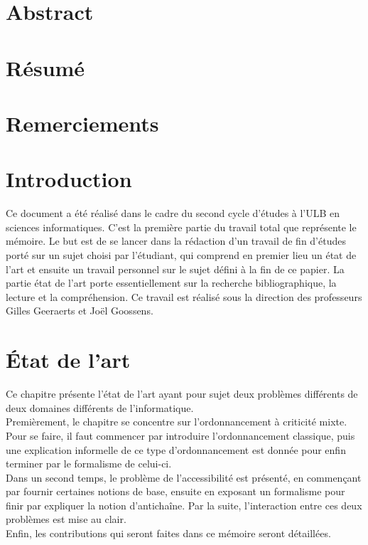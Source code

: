 \documentclass[12pt,a4paper,oneside]{book}
\theoremstyle{break}
\theoremstyle{breakplain}
\begin{document}
\newpage
\thispagestyle{empty} 
\null



\frontmatter



\chapter*{Abstract}

\chapter*{Résumé}

\chapter*{Remerciements}

\tableofcontents


\mainmatter


\chapter{Introduction}
Ce document a été réalisé dans le cadre du second cycle d'études à l'ULB en sciences informatiques. C'est la première partie du travail total que représente le mémoire. Le but est de se lancer dans la rédaction d'un travail de fin d'études porté sur un sujet choisi par l'étudiant, qui comprend en premier lieu un état de l'art et ensuite un travail personnel sur le sujet défini à la fin de ce papier. La partie état de l'art porte essentiellement sur la recherche bibliographique, la lecture et la compréhension. Ce travail est réalisé sous la direction des professeurs Gilles Geeraerts et Joël Goossens.


\chapter{État de l'art}

Ce chapitre présente l'état de l'art ayant pour sujet deux problèmes différents de deux domaines différents de l'informatique.\\
Premièrement, le chapitre se concentre sur l'ordonnancement à criticité mixte. Pour se faire, il faut commencer par introduire l'ordonnancement classique, puis une explication informelle de ce type d'ordonnancement est donnée pour enfin terminer par le formalisme de celui-ci.\\
Dans un second temps, le problème de l'accessibilité est présenté, en commençant par fournir certaines notions de base, ensuite en exposant un formalisme pour finir par expliquer la notion d'antichaîne. Par la suite, l'interaction entre ces deux problèmes est mise au clair.\\
Enfin, les contributions qui seront faites dans ce mémoire seront détaillées.
\end{document}
